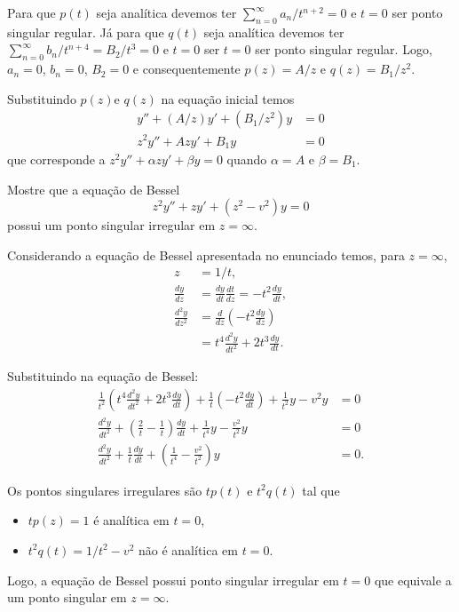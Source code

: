\documentclass[a4paper,12pt, leqno, answers]{exam}
\begin{document}
\begin{questions}
\begin{solution}
        Para que $p(t)$ seja anal\'{i}tica devemos ter $\sum_{n = 0}^\infty a_n / t^{n + 2} = 0$ e $t = 0$ ser ponto singular regular. J\'{a} para que $q(t)$ seja anal\'{i}tica devemos ter $\sum_{n = 0}^\infty b_n / t^{n + 4} = B_2 / t^3 = 0$ e $t = 0$ ser $t = 0$ ser ponto singular regular. Logo, $a_n = 0$, $b_n = 0$, $B_2 = 0$ e consequentemente $p(z) = A / z$ e $q(z) = B_1 / z^2$.

        Substituindo $p(z)$e $q(z)$ na equa\c{c}\~{a}o inicial temos
        \begin{align*}
            y'' + \left( A / z \right) y' + \left( B_1 /z^2 \right) y &= 0 \\
            z^2 y'' + A z y' + B_1 y &= 0
        \end{align*}
        que corresponde a $z^2 y'' + \alpha z y' + \beta y = 0$ quando $\alpha = A$ e $\beta = B_1$.
    \end{solution}

    \question Mostre que a equa\c{c}\~{a}o de Bessel
    \[
    z^2 y'' + z y' + \left( z^2 - v^2 \right) y = 0
    \]
    possui um ponto singular irregular em $z = \infty$.
    \begin{solution}
        Considerando a equa\c{c}\~{a}o de Bessel apresentada no enunciado temos, para $z = \infty$,
        \begin{align*}
            z &= 1 / t, \\
            \frac{d y}{d z} &= \frac{d y}{d t} \frac{d t}{d z} = -t^2 \frac{d y}{d t}, \\
            \frac{d^2 y}{d z^2} &= \frac{d}{d z} \left( - t^2 \frac{d y}{d z} \right) \\
            &= t^4 \frac{d^2 y}{d t^2} + 2 t^3 \frac{d y}{d t}.
        \end{align*}

        Substituindo na equa\c{c}\~{a}o de Bessel:
        \begin{align*}
            \frac{1}{t^2} \left( t^4 \frac{d^2 y}{d t^2} + 2 t^3 \frac{d y}{d t} \right) + \frac{1}{t} \left( - t^2 \frac{d y}{d t} \right) + \frac{1}{t^2} y - v^2 y &= 0 \\
            \frac{d^2 y}{d t^2} + \left( \frac{2}{t} - \frac{1}{t} \right) \frac{d y}{d t} + \frac{1}{t^4} y - \frac{v^2}{t^2} y &= 0 \\
            \frac{d^2 y}{d t^2} + \frac{1}{t} \frac{d y}{d t} + \left( \frac{1}{t^4} - \frac{v^2}{t^2} \right) y &= 0.
        \end{align*}

        Os pontos singulares irregulares s\~{a}o $t p(t)$ e $t^2 q(t)$ tal que
        \begin{itemize}
            \item $t p(z) = 1$ \'{e} anal\'{i}tica em $t = 0$,
            \item $t^2 q(t) = 1 / t^2 - v^2$ n\~{a}o \'{e} anal\'{i}tica em $t = 0$.
        \end{itemize}
        Logo, a equa\c{c}\~{a}o de Bessel possui ponto singular irregular em $t = 0$ que equivale a um ponto singular em $z = \infty$.
    \end{solution}


\end{questions}
\end{document}
